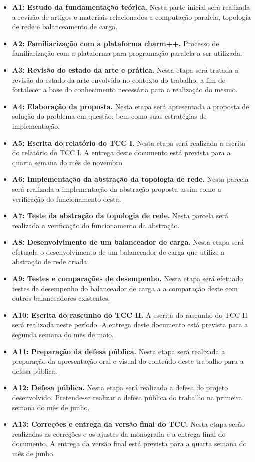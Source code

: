 \begin{itemize}
	\item \textbf{A1: Estudo da fundamentação teórica.} Nesta parte inicial será realizada a revisão de artigos e materiais relacionados a computação paralela, topologia de rede e balanceamento de carga.
	\item \textbf{A2: Familiarização com a plataforma charm++.} Processo de familiarização com a plataforma para programação paralela a ser utilizada.
	\item \textbf{A3: Revisão do estado da arte e prática.} Nesta etapa será tratada a revisão do estado da arte envolvido no contexto do trabalho, a fim de  fortalecer a base do conhecimento necessária para a realização do mesmo.
	\item \textbf{A4: Elaboração da proposta.} Nesta etapa será apresentada a proposta de solução do problema em questão, bem como suas estratégias de implementação.
	\item \textbf{A5: Escrita do relatório do TCC I.} Nesta etapa será realizada a escrita do relatório do TCC I. A entrega deste documento está prevista para a quarta semana do mês de novembro.
	\item \textbf{A6: Implementação da abstração da topologia de rede.} Nesta parcela será realizada a implementação da abstração proposta assim como a verificação do funcionamento desta.
	\item \textbf{A7: Teste da abstração da topologia de rede.} Nesta parcela será realizada a verificação do funcionamento da abstração.
	\item \textbf{A8: Desenvolvimento de um balanceador de carga.} Nesta etapa será efetuada o desenvolvimento de um balanceador de carga que utilize a abstração de rede criada.
	\item \textbf{A9: Testes e comparações de desempenho.} Nesta etapa será efetuado testes de desempenho do balanceador de carga a a comparação deste com outros balanceadores existentes.
	\item \textbf{A10: Escrita do rascunho do TCC II.} A escrita do rascunho do TCC II será realizada neste período. A entrega deste documento está prevista para a segunda semana do mês de maio.
	\item \textbf{A11: Preparação da defesa pública.} Nesta etapa será realizada a preparação da apresentação oral e visual do conteúdo deste trabalho para a defesa pública.
	\item \textbf{A12: Defesa pública.} Nesta etapa será realizada a defesa do projeto desenvolvido. Pretende-se realizar a defesa pública do trabalho na primeira semana do mês de junho.
	\item \textbf{A13: Correções e entrega da versão final do TCC.} Nesta etapa serão realizadas as correções e os ajustes da monografia e a entrega final do documento. A entrega da versão final está prevista para a quarta semana do mês de junho.
\end{itemize}

